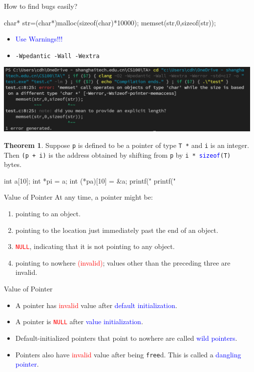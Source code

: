 \documentclass{beamer}
\newcommand{\red}[1]{\textcolor{red}{#1}}
\newcommand{\blue}[1]{\textcolor{blue}{#1}}
\newcommand{\ttt}[1]{\texttt{#1}}
\newcommand{\bluett}[1]{\blue{\ttt{#1}}}
\newcommand{\redtt}[1]{\red{\ttt{#1}}}
\theoremstyle{definition}
\newtheorem{thm}{Theorem}
\begin{document}
\begin{frame}[fragile]{How to find bugs easily?}
    \begin{cpp}
char* str=(char*)malloc(sizeof(char)*10000);
memset(str,0,sizeof(str));
    \end{cpp}
    \begin{itemize}
    \item \blue{Use Warnings!!!}
    \pause
    \item \texttt{-Wpedantic -Wall -Wextra}
    \end{itemize}
    \includegraphics[width=\linewidth]{pic1.jpg}
\end{frame}

\begin{frame}[fragile]
    \begin{thm}
        Suppose \ttt{p} is defined to be a pointer of type \ttt{T *} and \ttt{i} is an integer. Then \ttt{(p + i)} is the address obtained by shifting from \ttt{p} by \ttt{i * }\bluett{sizeof}\ttt{(T)} bytes.
    \end{thm}
    \pause
    \begin{cpp}
int a[10];
int *pi = a;
int (*pa)[10] = &a;
printf("%
printf("%
    \end{cpp}
\end{frame}

\begin{frame}{Value of Pointer}
    At any time, a pointer might be:
    \begin{enumerate}
        \item pointing to an object.
        \item pointing to the location just immediately past the end of an object.
        \item \redtt{NULL}, indicating that it is not pointing to any object.
        \item pointing to nowhere \red{(invalid)}; values other than the preceding three are invalid.
    \end{enumerate}
\end{frame}

\begin{frame}{Value of Pointer}
    \begin{itemize}
        \item A pointer has \red{invalid} value after \blue{default initialization}.
        \item A pointer is \redtt{NULL} after \blue{value initialization}.
        \pause
        \item Default-initialized pointers that point to nowhere are called \blue{wild pointers}.
        \item Pointers also have \red{invalid} value after being \ttt{free}d. This is called a \blue{dangling pointer}.
    \end{itemize}
\end{frame}
\end{document}
